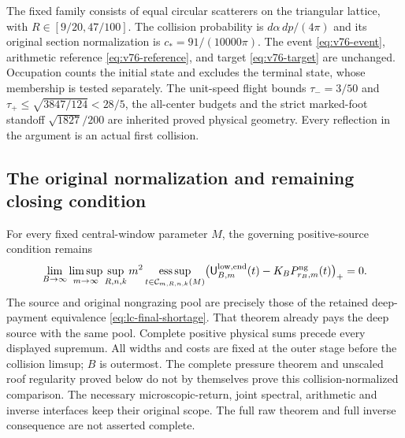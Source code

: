 \documentclass[11pt,reqno]{amsart}
\numberwithin{equation}{section}
\theoremstyle{definition}\newtheorem{definition}[theorem]{Definition}
\theoremstyle{remark}\newtheorem{remark}[theorem]{Remark}
\begin{document}
The fixed family consists of equal circular scatterers on the
triangular lattice, with $R\in[9/20,47/100]$. The collision probability
is $d\alpha\,dp/(4\pi)$ and its original section normalization is
$c_*=91/(10000\pi)$. The event \eqref{eq:v76-event}, arithmetic
reference \eqref{eq:v76-reference}, and target \eqref{eq:v76-target}
are unchanged. Occupation counts the initial state and excludes
the terminal state, whose membership is tested separately.
The unit-speed flight bounds
$\tau_-=3/50$ and $\tau_+\le\sqrt{3847/124}<28/5$, the all-center
budgets and the strict marked-foot standoff $\sqrt{1827}/200$
are inherited proved physical geometry. Every reflection in the
argument is an actual first collision.



\subsection*{The original normalization and remaining closing condition}
For every fixed central-window parameter $M$, the governing
positive-source condition remains
\begin{equation}\label{eq:sc-original-obligation}
 \lim_{B\to\infty}\limsup_{m\to\infty}\sup_{R,n,k}
 m^2\operatorname*{ess\,sup}_{t\in\mathcal C_{m,R,n,k}(M)}
 \bigl(\mathsf U^{\rm low,end}_{B,m}(t)
                    -K_BP^{\rm ng}_{r_B,m}(t)\bigr)_+=0.
\end{equation}
The source and original nongrazing pool are precisely those of the
retained deep-payment equivalence \eqref{eq:lc-final-shortage}.
That theorem already pays the deep source with the same pool.
Complete positive physical sums precede every displayed supremum. All widths and costs
are fixed at the outer stage before the collision limsup; $B$ is
outermost. The complete pressure theorem and unscaled roof regularity
proved below do not by themselves prove this collision-normalized
comparison. The necessary microscopic-return, joint spectral,
arithmetic and inverse interfaces keep their original scope. The
full raw theorem and full inverse consequence are not asserted complete.
\end{document}
